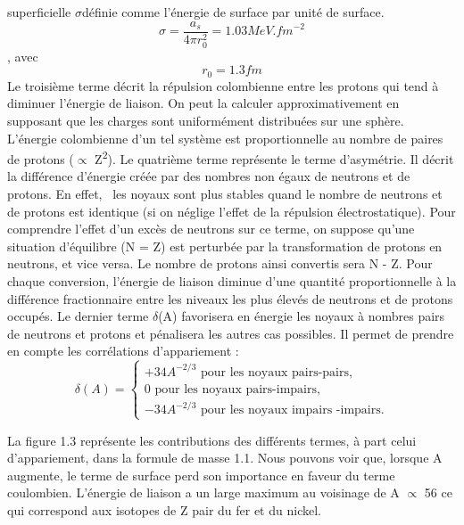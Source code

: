superficielle $\sigma $définie comme l'énergie de surface par unité de surface.
 \begin{equation}\sigma =\frac{a_s}{4\pi r_0^2}=1.03\mathit{MeV.}\mathit{fm}^{-2}\end{equation} , avec
 \begin{equation}r_0=1.3\mathit{fm}\end{equation}
 Le troisième terme décrit la répulsion colombienne entre les protons qui tend à diminuer l'énergie de
liaison. On peut la calculer approximativement en supposant que les charges sont uniformément distribuées sur une
sphère. L'énergie colombienne d'un tel système est proportionnelle au nombre de paires de protons (${\propto}$
Z\textsuperscript{2}).
 Le quatrième terme représente le terme d'asymétrie. Il décrit la différence d'énergie créée par des
nombres non égaux de neutrons et de protons. En effet, \textcolor[rgb]{0.1254902,0.12941177,0.13333334}{~les noyaux
sont plus stables quand le nombre de neutrons et de protons est identique (si on néglige l'effet de la répulsion
électrostatique).} Pour comprendre l'effet d'un excès de neutrons sur
ce terme, on suppose qu'une situation d'équilibre (N = Z) est perturbée par la transformation de protons en neutrons,
et vice versa. Le nombre de protons ainsi convertis sera N - Z.
Pour chaque conversion, l'énergie de liaison diminue d'une quantité proportionnelle à la différence fractionnaire entre
les niveaux les plus élevés de neutrons et de protons occupés.
 Le dernier terme $\delta $(A) favorisera en énergie les noyaux à nombres pairs de neutrons et protons et
pénalisera les autres cas possibles. Il permet de prendre en compte les corrélations d'appariement :
 \begin{equation}\delta
\left(A\right)=\left\{\begin{matrix}+34A^{-2/3}\text{  pour les noyaux pairs-pairs},\\0\text{  pour les noyaux pairs-impairs},\\-34A^{-2/3}\text{  pour les noyaux impairs -impairs.}\end{matrix}\right.\end{equation}

La figure 1.3 représente les contributions des différents termes, à part celui d'appariement, dans la formule de masse
1.1. Nous pouvons voir que, lorsque A augmente, le terme de surface perd son importance en faveur du terme coulombien.
L'énergie de liaison a un large maximum au voisinage de A ${\propto}$ 56 ce qui correspond aux isotopes de Z pair du
fer et du nickel.
